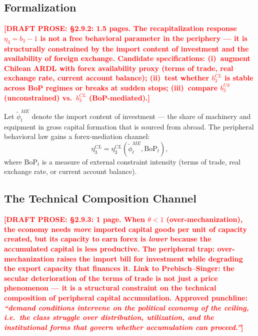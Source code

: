 \documentclass[12pt,letterpaper]{article}
\newcommand{\draftnote}[1]{%
  \textcolor{red}{\textbf{[DRAFT PROSE: #1]}}}
\begin{document}
\subsection{Formalization}
\label{sec:tavares_formal}

\draftnote{§2.9.2: 1.5 pages. The recapitalization response
  $\eta_3 = b_3 - 1$ is not a free behavioral parameter in the periphery —
  it is structurally constrained by the import content of investment and
  the availability of foreign exchange.
  Candidate specifications: (i)~augment Chilean ARDL with forex availability
  proxy (terms of trade, real exchange rate, current account balance);
  (ii)~test whether $b_3^{CL}$ is stable across BoP regimes or breaks at
  sudden stops; (iii)~compare $b_3^{US}$ (unconstrained) vs.\ $b_3^{CL}$
  (BoP-mediated).}

Let $\tilde{\phi}^{ME}_t$ denote the import content of investment —
the share of machinery and equipment in gross capital formation that is
sourced from abroad. The peripheral behavioral law gains a
forex-mediation channel:
\begin{equation}
  \eta^{CL}_3 = \eta^{CL}_3\!\left(\tilde{\phi}^{ME}_t, \text{BoP}_t\right),
  \label{eq:tavares_constraint}
\end{equation}
where $\text{BoP}_t$ is a measure of external constraint intensity
(terms of trade, real exchange rate, or current account balance).


\subsection{The Technical Composition Channel}
\label{sec:tech_composition}

\draftnote{§2.9.3: 1 page. When $\theta < 1$ (over-mechanization), the economy
  needs \emph{more} imported capital goods per unit of capacity created, but its
  capacity to earn forex is \emph{lower} because the accumulated capital is less
  productive. The peripheral trap: over-mechanization raises the import bill for
  investment while degrading the export capacity that finances it.
  Link to Prebisch--Singer: the secular deterioration of the terms of trade
  is not just a price phenomenon — it is a structural constraint on the
  technical composition of peripheral capital accumulation.
  Approved punchline: \emph{``demand conditions intervene on the political economy
  of the ceiling, i.e.\ the class struggle over distribution, utilization, and
  the institutional forms that govern whether accumulation can proceed.''}}
\end{document}
